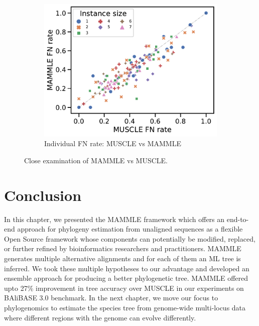 \begin{figure}[!htbp]
\begin{adjustwidth}{-1.1cm}{}
		\begin{subfigure}{0.60\textwidth} \includegraphics[width=\textwidth]{Figure/delta5-ast} \caption{Individual FN rate: MUSCLE vs MAMMLE}\label{fig:scatter-fn-ast}\end{subfigure}
	\end{adjustwidth}
	\caption{Close examination of MAMMLE vs MUSCLE.}
	\label{fig:mammle-result-ast}
\end{figure}

\section{Conclusion}
In this chapter, we presented the MAMMLE framework which offers an end-to-end approach for phylogeny estimation from unaligned sequences as a flexible Open Source framework whose components can potentially be modified, replaced, or further refined by bioinformatics researchers and practitioners. MAMMLE generates multiple alternative alignments and for each of them an ML tree is inferred. We took these multiple hypotheses to our advantage and developed an ensemble approach for producing a better phylogenetic tree. MAMMLE offered upto 27\% improvement in tree accuracy over MUSCLE in our experiments on BAliBASE 3.0 benchmark.
In the next chapter, we move our focus to phylogenomics to estimate the species tree from genome-wide multi-locus data where different regions with the genome can evolve differently. 

